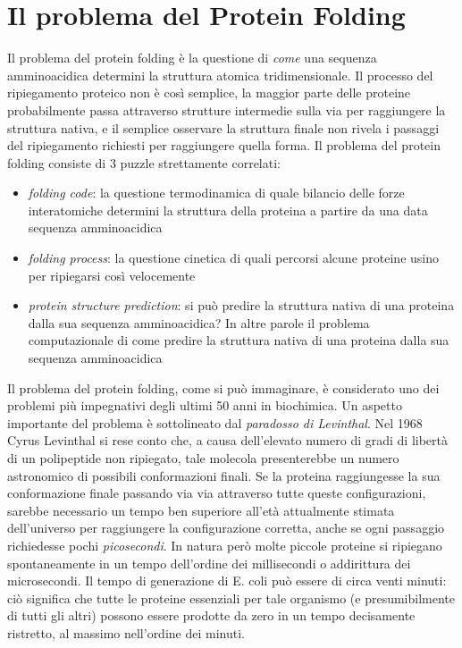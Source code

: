 \section{Il problema del Protein Folding} \label{sec:problema-protein-folding}
{
Il problema del protein folding è la questione di \textit{come} una sequenza amminoacidica determini la struttura atomica tridimensionale. Il processo del ripiegamento proteico non è così semplice, la maggior parte delle proteine probabilmente passa attraverso strutture intermedie sulla via per raggiungere la struttura nativa, e il semplice osservare la struttura finale non rivela i passaggi del ripiegamento richiesti per raggiungere quella forma. Il problema del protein folding consiste di 3 puzzle strettamente correlati\supercite{dill2008protein}:
\begin{itemize}
	\item \textit{folding code}: la questione termodinamica di quale bilancio delle forze interatomiche determini la struttura della proteina a partire da una data sequenza amminoacidica
	
	\item \textit{folding process}: la questione cinetica di quali percorsi alcune proteine usino per ripiegarsi così velocemente
	
	\item\textit{protein structure prediction}: si può predire la struttura nativa di una proteina dalla sua sequenza amminoacidica? In altre parole il problema computazionale di come predire la struttura nativa di una proteina dalla sua sequenza amminoacidica
	
\end{itemize}	

Il problema del protein folding, come si può immaginare, è considerato uno dei problemi più impegnativi degli ultimi 50 anni in biochimica. Un aspetto importante del problema è sottolineato dal \textit{paradosso di Levinthal}. Nel 1968 Cyrus Levinthal si rese conto che, a causa dell'elevato numero di gradi di libertà di un polipeptide non ripiegato, tale molecola presenterebbe un numero astronomico di possibili conformazioni finali. Se la proteina raggiungesse la sua conformazione finale passando via via attraverso tutte queste configurazioni, sarebbe necessario un tempo ben superiore all'età attualmente stimata dell'universo per raggiungere la configurazione corretta, anche se ogni passaggio richiedesse pochi \textit{picosecondi}. In natura però molte piccole proteine si ripiegano spontaneamente in un tempo dell'ordine dei millisecondi o addirittura dei microsecondi. Il tempo di generazione di E. coli può essere di circa venti minuti: ciò significa che tutte le proteine essenziali per tale organismo (e presumibilmente di tutti gli altri) possono essere prodotte da zero in un tempo decisamente ristretto, al massimo nell'ordine dei minuti.

}
